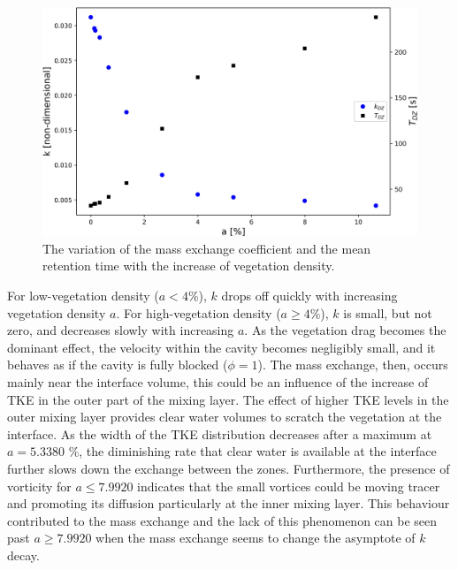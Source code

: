 \begin{figure}[!htb]
\centering
\includegraphics[width=\linewidth]{../images/art4/massExchange.jpg}
\caption{The variation of the mass exchange coefficient and the mean retention time with the increase of vegetation density.}
\label{fig:art4:massExchange}
\end{figure}

For low-vegetation density ($a < 4$\%), $k$ drops off quickly with increasing vegetation density $a$. For high-vegetation density ($a \geq 4$\%), $k$ is small, but not zero, and decreases slowly with increasing $a$. As the vegetation drag becomes the dominant effect, the velocity within the cavity becomes negligibly small, and it behaves as if the cavity is fully blocked ($\phi = 1$). The mass exchange, then, occurs mainly near the interface volume, this could be an influence of the increase of TKE in the outer part of the mixing layer. The effect of higher TKE levels in the outer mixing layer provides clear water volumes to scratch the vegetation at the interface. As the width of the TKE distribution decreases after a maximum at $a = 5.3380$ \%, the diminishing rate that clear water is available at the interface further slows down the exchange between the zones. Furthermore, the presence of vorticity for $a \leq 7.9920$ indicates that the small vortices could be moving tracer and promoting its diffusion particularly at the inner mixing layer. This behaviour contributed to the mass exchange and the lack of this phenomenon can be seen past $a \geq 7.9920$ when the mass exchange seems to change the asymptote of $k$ decay.

